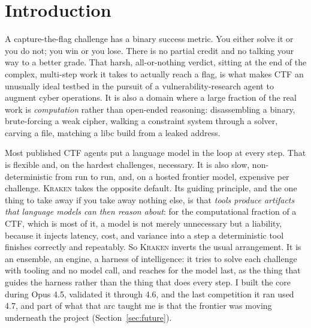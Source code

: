 \documentclass[10pt,twocolumn]{article}
\newcommand{\kraken}{\textsc{Kraken}}
\begin{document}
\section{Introduction}

A capture-the-flag challenge has a binary success metric. You either solve it or you do not; you win or
you lose. There is no partial credit and no talking your way to a better grade. That harsh, all-or-nothing
verdict, sitting at the end of the complex, multi-step work it takes to actually reach a flag, is what
makes CTF an unusually ideal testbed in the pursuit of a vulnerability-research agent to augment cyber
operations. It is also a domain where a large fraction of the real work is \emph{computation} rather than
open-ended reasoning: disassembling a binary, brute-forcing a weak cipher, walking a constraint system
through a solver, carving a file, matching a libc build from a leaked address.

Most published CTF agents put a language model in the loop at every step. That is flexible and, on the
hardest challenges, necessary. It is also slow, non-deterministic from run to run, and, on a hosted
frontier model, expensive per challenge. \kraken{} takes the opposite default. Its guiding principle, and
the one thing to take away if you take away nothing else, is that \emph{tools produce artifacts that
language models can then reason about}: for the computational fraction of a CTF, which is most of it, a
model is not merely unnecessary but a liability, because it injects latency, cost, and variance into a
step a deterministic tool finishes correctly and repeatably. So \kraken{} inverts the usual arrangement.
It is an ensemble, an engine, a harness of intelligence: it tries to solve each challenge with tooling and
no model call, and reaches for the model last, as the thing that guides the harness rather than the thing
that does every step. I built the core during Opus 4.5, validated it through 4.6, and the last competition
it ran used 4.7, and part of what that arc taught me is that the frontier was moving underneath the
project (Section~\ref{sec:future}).
\end{document}
